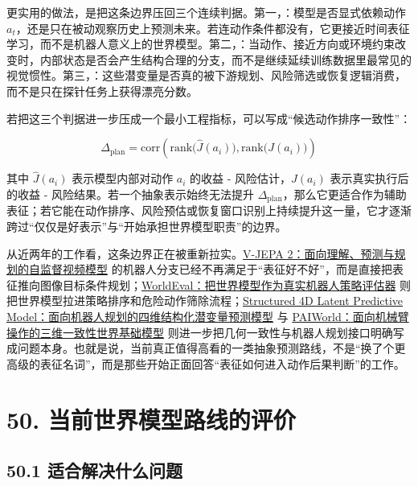 更实用的做法，是把这条边界压回三个连续判据。第一，\texttt{}：模型是否显式依赖动作 \(a_t\)，还是只在被动观察历史上预测未来。若连动作条件都没有，它更接近时间表征学习，而不是机器人意义上的世界模型。第二，\texttt{}：当动作、接近方向或环境约束改变时，内部状态是否会产生结构合理的分支，而不是继续延续训练数据里最常见的视觉惯性。第三，\texttt{}：这些潜变量是否真的被下游规划、风险筛选或恢复逻辑消费，而不是只在探针任务上获得漂亮分数。

若把这三个判据进一步压成一个最小工程指标，可以写成“候选动作排序一致性”：

\begingroup
\scriptsize
\begin{equation*}
\Delta_{\text{plan}}
=
\mathrm{corr}
\left(
\mathrm{rank}\bigl(\hat{J}(a_i)\bigr),
\mathrm{rank}\bigl(J(a_i)\bigr)
\right)
\end{equation*}
\endgroup

其中 \(\hat{J}(a_i)\) 表示模型内部对动作 \(a_i\) 的收益 - 风险估计，\(J(a_i)\) 表示真实执行后的收益 - 风险结果。若一个抽象表示始终无法提升 \(\Delta_{\text{plan}}\)，那么它更适合作为辅助表征；若它能在动作排序、风险预估或恢复窗口识别上持续提升这一量，它才逐渐跨过“仅仅是好表示”与“开始承担世界模型职责”的边界。

从近两年的工作看，这条边界正在被重新拉实。\href{https://arxiv.org/abs/2506.09985}{V-JEPA 2：面向理解、预测与规划的自监督视频模型} 的机器人分支已经不再满足于“表征好不好”，而是直接把表征推向图像目标条件规划；\href{https://arxiv.org/abs/2505.19017}{WorldEval：把世界模型作为真实机器人策略评估器} 则把世界模型拉进策略排序和危险动作筛除流程；\href{https://arxiv.org/abs/2607.01166}{Structured 4D Latent Predictive Model：面向机器人规划的四维结构化潜变量预测模型} 与 \href{https://arxiv.org/abs/2606.18375}{PAIWorld：面向机械臂操作的三维一致性世界基础模型} 则进一步把几何一致性与机器人规划接口明确写成问题本身。也就是说，当前真正值得高看的一类抽象预测路线，不是“换了个更高级的表征名词”，而是那些开始正面回答“表征如何进入动作后果判断”的工作。

\chapter*{50. 当前世界模型路线的评价}

\section*{50.1 适合解决什么问题}


